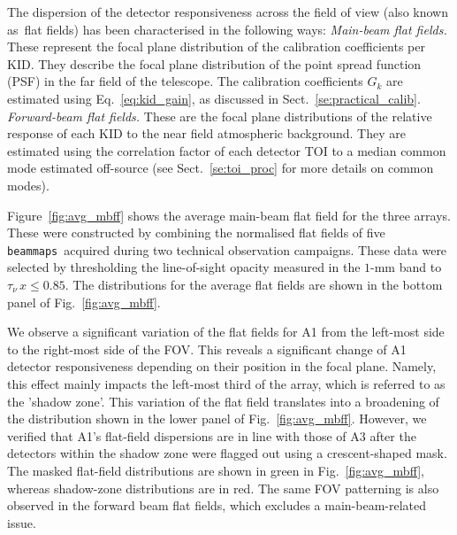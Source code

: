 \documentclass[traditionalabstract]{aa}
\newcommand{\bms}{{\tt beammaps}}
\newcommand{\taunu}{\tau_{\nu}}
\newcommand{\lp}[1]{#1}
\begin{document}
{The dispersion of the detector responsiveness across the field of view (also known as\ flat
fields) has been characterised in the following ways:
\noindent \emph{Main-beam flat fields.} These represent the focal plane
distribution of the calibration coefficients per KID. {\lp They describe the
focal plane distribution of the point spread function (PSF) in
the far field of the telescope.} The calibration coefficients $G_k$ are
estimated using Eq.~\ref{eq:kid_gain}, as discussed in
Sect.~\ref{se:practical_calib}.
\noindent \emph{Forward-beam flat fields.} These are the focal plane
distributions of the relative response of
each KID to the near field atmospheric background. They are estimated
using the correlation factor of each detector TOI 
to a median common mode estimated off-source (see Sect.~\ref{se:toi_proc} for
more details on common modes).

Figure~\ref{fig:avg_mbff} %
shows the average main-beam %
flat field for the three arrays. These were constructed by
combining the normalised flat fields of five \bms\ acquired during two
technical observation campaigns. These data were
selected by thresholding the line-of-sight opacity measured in the
$1$-mm band to $\taunu\,x \leq 0.85$. The distributions for the average flat
fields are shown in the bottom panel of Fig.~\ref{fig:avg_mbff}.%

We observe a significant variation of the flat fields for A1 from the left-most side
to the right-most side of the FOV. This reveals a significant change of A1
detector responsiveness depending on their position in the focal plane. Namely, this
effect mainly impacts the left-most third of the array, which is
referred to as the 'shadow zone'. This variation of the
flat field translates into a broadening of the distribution shown in
the lower panel of Fig.~\ref{fig:avg_mbff}.  However,
we verified that A1's flat-field dispersions are in line with those of A3 after the
detectors within the shadow zone were flagged out using a
crescent-shaped mask. The masked flat-field distributions are shown in
green in Fig.~\ref{fig:avg_mbff}, %
whereas shadow-zone distributions are in red. The same FOV patterning
is also observed in the forward beam flat fields, which excludes a
main-beam-related issue. 

}
\end{document}
